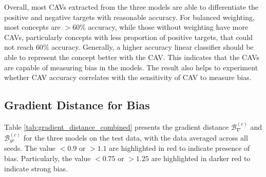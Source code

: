 Overall, most CAVs extracted from the three models are able to differentiate the positive and negative targets with reasonable accuracy. For balanced weighting, most concepts are $> 60\%$ accuracy, while those without weighting have more CAVs, particularly concepts with less proportion of positive targets, that could not reach $60\%$ accuracy. Generally, a higher accuracy linear classifier should be able to represent the concept better with the CAV. This indicates that the CAVs are capable of measuring bias in the models. The result also helps to experiment whether CAV accuracy correlates with the sensitivity of CAV to measure bias.

\subsection{Gradient Distance for Bias} \label{sec:gradient_distance}

Table \ref{tab:gradient_distance_combined} presents the gradient distance $\mathcal{B}^{(c)}_{\nabla}$ and $\mathcal{B}^{(c)}_{gr}$ for the three models on the test data, with the data averaged across all seeds. The value $< 0.9$ or $> 1.1$ are highlighted in red to indicate presence of bias. Particularly, the value $< 0.75$ or $> 1.25$ are highlighted in darker red to indicate strong bias.


